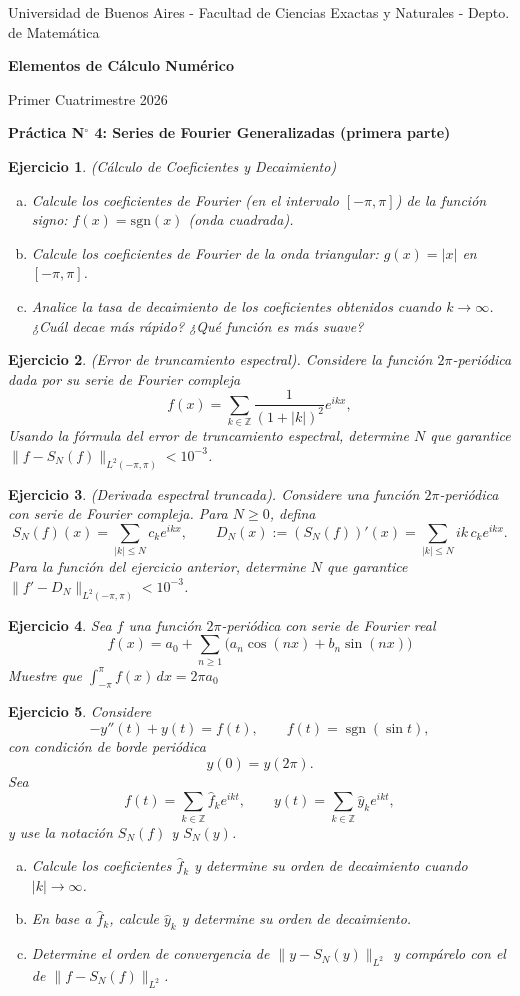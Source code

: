 \documentclass[12pt]{article}
\newtheorem{exercise}{Ejercicio}
\newcommand{\bej}{\begin{exercise}\rm}
\newcommand{\fej}{\end{exercise}}
\begin{document}
\centerline{{\small Universidad de Buenos Aires - Facultad de Ciencias Exactas y Naturales - Depto. de Matemática}}
 
 \vskip 0.2cm
 \hrulefill
 \vskip 0.2cm

 \centerline{{\bf\Huge {\sc Elementos de Cálculo Numérico}}}
 \vskip 0.2cm
 \centerline{\ttfamily Primer Cuatrimestre 2026}
 \hrulefill

 \bigskip
 \centerline{\bf Práctica N$^\circ$ 4: Series de Fourier Generalizadas (primera parte)}
 \bigskip

\bej (Cálculo de Coeficientes y Decaimiento)
\begin{enumerate}[(a)]
    \item Calcule los coeficientes de Fourier (en el intervalo $[-\pi, \pi]$) de la función signo: $f(x) = \text{sgn}(x)$ (onda cuadrada).
    \item Calcule los coeficientes de Fourier de la onda triangular: $g(x) = |x|$ en $[-\pi, \pi]$.
    \item Analice la tasa de decaimiento de los coeficientes obtenidos cuando $k \to \infty$. ¿Cuál decae más rápido? ¿Qué función es más suave?
\end{enumerate}
\fej

\bej (Error de truncamiento espectral). Considere la función $2\pi$-periódica dada por su serie de Fourier compleja
\[
f(x)=\sum_{k\in\mathbb Z} \frac{1}{(1+|k|)^2} e^{ikx},
\]
Usando la fórmula del error de truncamiento espectral, determine $N$ que garantice $\|f-S_N(f)\|_{L^2(-\pi,\pi)}<10^{-3}$.

\fej

\bej (Derivada espectral truncada). Considere una función $2\pi$-periódica con serie de Fourier compleja. Para $N\ge 0$, defina
\[
S_N(f)(x)=\sum_{|k|\le N} c_k e^{ikx},
\qquad
D_N(x):=(S_N(f))'(x)=\sum_{|k|\le N} ik\,c_k e^{ikx}.
\]
Para la función del ejercicio anterior, determine $N$ que garantice $\|f'-D_N\|_{L^2(-\pi,\pi)}<10^{-3}$.
\fej

\bej 
Sea $f$ una función $2\pi$-periódica con serie de Fourier real 
$$f(x)=a_0+\sum_{n\ge 1}\big(a_n\cos(nx)+b_n\sin(nx)\big)$$ 
Muestre que $\int_{-\pi}^{\pi} f(x)\,dx=2\pi a_0$
\fej

\bej
Considere
\[
-y''(t)+y(t)=f(t),\qquad f(t)=\operatorname{sgn}(\sin t),
\]
con condición de borde periódica
\[
y(0)=y(2\pi).
\]
Sea
\[
f(t)=\sum_{k\in\mathbb Z}\hat f_k e^{ikt},
\qquad
y(t)=\sum_{k\in\mathbb Z}\hat y_k e^{ikt},
\]
y use la notación $S_N(f)$ y $S_N(y)$.
\begin{enumerate}[(a)]
    \item Calcule los coeficientes $\hat f_k$ y determine su orden de decaimiento cuando $|k|\to\infty$.
    \item En base a $\hat f_k$, calcule $\hat y_k$ y determine su orden de decaimiento.
    \item Determine el orden de convergencia de $\|y-S_N(y)\|_{L^2}$ y compárelo con el de $\|f-S_N(f)\|_{L^2}$.
\end{enumerate}
\fej
\end{document}
